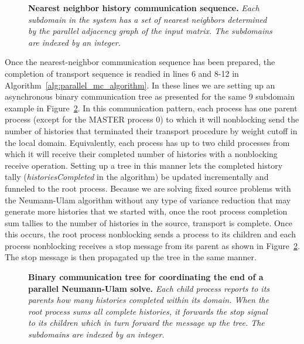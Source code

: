 \begin{figure}[t!]
  \begin{center}
    \scalebox{1.5}{  }
  \end{center}
  \caption{\textbf{Nearest neighbor history communication sequence.}
    \textit{Each subdomain in the system has a set of nearest
      neighbors determined by the parallel adjacency graph of the
      input matrix. The subdomains are indexed by an integer.}}
  \label{fig:nearest_neighbor_comm}
\end{figure}

Once the nearest-neighbor communication sequence has been prepared,
the completion of transport sequence is readied in lines 6 and 8-12 in
Algorithm~\ref{alg:parallel_mc_algorithm}. In these lines we are
setting up an asynchronous binary communication tree as presented for
the same 9 subdomain example in Figure~\ref{fig:binary_comm_tree}. In
this communication pattern, each process has one parent process
(except for the MASTER process 0) to which it will nonblocking send
the number of histories that terminated their transport procedure by
weight cutoff in the local domain. Equivalently, each process has up
to two child processes from which it will receive their completed
number of histories with a nonblocking receive operation. Setting up a
tree in this manner lets the completed history tally
(\textit{historiesCompleted} in the algorithm) be updated
incrementally and funneled to the root process. Because we are
solving fixed source problems with the Neumann-Ulam algorithm without
any type of variance reduction that may generate more histories that
we started with, once the root process completion sum tallies to the
number of histories in the source, transport is complete. Once this
occurs, the root process nonblocking sends a process to its children
and each process nonblocking receives a stop message from its parent
as shown in Figure~\ref{fig:binary_comm_tree}. The stop message is
then propagated up the tree in the same manner.

\begin{figure}[t!]
  \begin{center}
    \scalebox{1.25}{
       }
    \caption{\textbf{Binary communication tree for coordinating the
        end of a parallel Neumann-Ulam solve.} \textit{Each child
        process reports to its parents how many histories completed
        within its domain. When the root process sums all complete
        histories, it forwards the stop signal to its children which
        in turn forward the message up the tree. The subdomains are
        indexed by an integer.}}
  \end{center}
  \label{fig:binary_comm_tree}
\end{figure}

